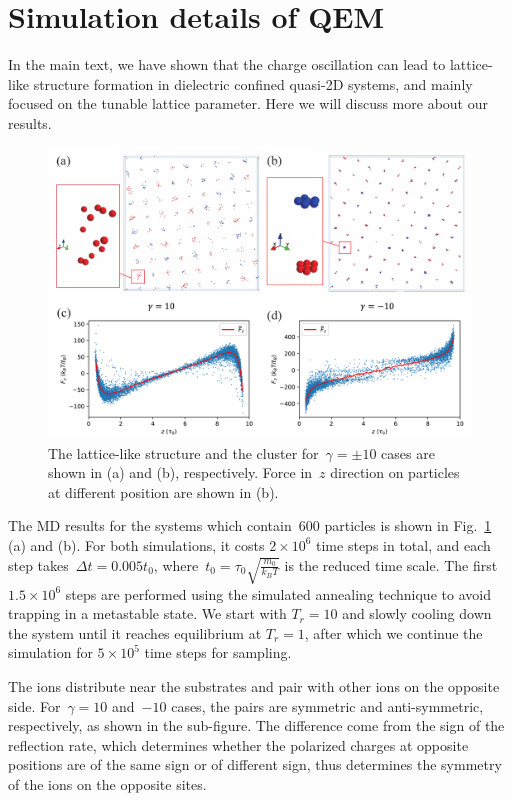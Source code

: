 \section{Simulation details of QEM}

In the main text, we have shown that the charge oscillation can lead to lattice-like structure formation in dielectric confined quasi-2D systems, and mainly focused on the tunable lattice parameter.
Here we will discuss more about our results.

\begin{figure}[ht]
    \centering
    \includegraphics[width = \linewidth]{figs/MD_ball.pdf}
    \caption{The lattice-like structure and the cluster for~$\gamma = \pm 10$ cases are shown in (a) and (b), respectively. Force in~$z$ direction on particles at different position are shown in (b).}
    \label{fig:balls}
\end{figure}

The MD results for the systems which contain~$600$ particles is shown in Fig.~\ref{fig:balls} (a) and (b).
For both simulations, it costs $2 \times 10^6$ time steps in total, and each step takes~$\Delta t = 0.005 t_0$, where~$t_0 = \tau_0 \sqrt{\frac{m_0}{k_B T}}$ is the reduced time scale.
The first $1.5\times 10^6$ steps are performed using the simulated annealing technique to avoid trapping in a metastable state. We start with $T_r=10$ and slowly cooling down the system until it reaches equilibrium at $T_r=1$, after which we continue the simulation for $5 \times 10^5$ time steps for sampling.

The ions distribute near the substrates and pair with other ions on the opposite side.
For~$\gamma = 10$ and~$-10$ cases, the pairs are symmetric and anti-symmetric, respectively, as shown in the sub-figure.
The difference come from the sign of the reflection rate, which determines whether the polarized charges at opposite positions are of the same sign or of different sign, thus determines the symmetry of the ions on the opposite sites.

